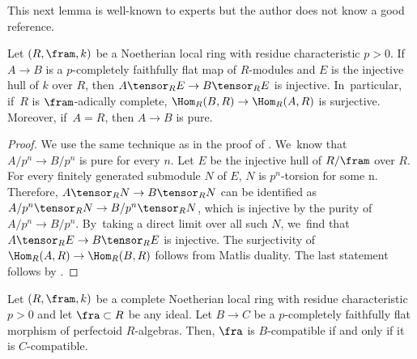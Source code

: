 \noindent This next lemma is well-known to experts but the author does not know a good reference.

\begin{lemma}\label{pcomp fflat implies pure}
Let $(R,\fram,k)$ be a Noetherian local ring with residue characteristic $p>0$. If~$A\to B$ is a $p$-completely faithfully flat map of $R$\nobreakdash-modules and $E$ is the injective hull of $k$ over $R$, then $A\tensor_R E\to B\tensor_R E$ is injective. In~particular, if~$R$ is $\fram$-adically complete, $\Hom_R(B,R)\to \Hom_R(A,R)$ is surjective. Moreover, if~$A=R$, then $A\to B$ is pure.
\end{lemma}

\begin{proof}
We use the same technique as in the proof of \cite[Lem.\,4.5]{BMPSTWWPerfectoidPure}. We~know that $A/p^n\to B/p^n$ is pure for every $n$. Let $E$ be the injective hull of $R/\fram$ over $R$. For every finitely generated submodule $N$ of $E$, $N$ is $p^n$-torsion for some n. Therefore, $A\tensor_R N \to B\tensor_R N$ can be identified as $A/p^n\tensor_R N \to B/p^n \tensor_R N$, which is injective by the purity of $A/p^n\to B/p^n$. By~taking a direct limit over all such $N$, we~find that $A\tensor_R E \to B\tensor_R E$ is injective. The surjectivity of $\Hom_R(A,R)\to \Hom_R(B,R)$ follows from Matlis duality.
The last statement follows by \cite[Prop.\,6.11]{HochsterRobertsRingsOfInvariants}.
\end{proof}

\begin{lemma}\label{compatible iff pcomp fflat comp}
Let $(R,\fram,k)$ be a complete Noetherian local ring with residue characteristic $p>0$ and let $\fra\subset R$ be any ideal.
Let $B\to C$ be a $p$-completely faithfully flat morphism of perfectoid $R$\nobreakdash-algebras. Then, $\fra$ is $B$-compatible if and only if it is $C$-compatible.
\end{lemma}

